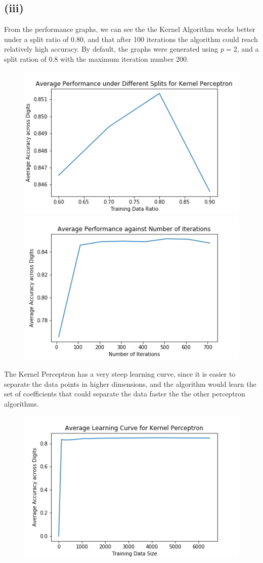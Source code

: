\documentclass[twoside,11pt]{homework}
\begin{document}
\subsection*{(iii)}
	From the performance graphs, we can see the the Kernel Algorithm works better under a split ratio of 0.80, and
	that after 100 iterations the algorithm could reach relatively high accuracy. By default, the graphs were generated using $p=2$, 
	and a split ration of 0.8 with the maximum iteration number 200.
	\begin{figure}[H]
		\includegraphics[scale=0.5]{q6/img/splits_ker.png}
		\includegraphics[scale=0.5]{q6/img/iterations_ker.png}
	\end{figure}
	The Kernel Perceptron has a very steep learning curve, since it is easier to separate the data points in higher dimensions, and 
	the algorithm would learn the set of coefficients that could separate the data faster the the other perceptron algorithms.
	\begin{figure}[H]
		\includegraphics[scale=0.5]{q6/img/learning_ker.png}
	\end{figure}
\end{document}
